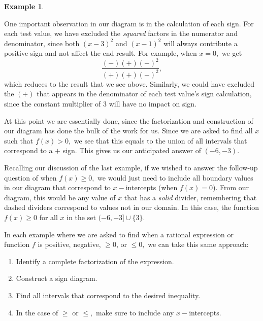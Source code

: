 \documentclass[12pt]{book}
\theoremstyle{definition}
\newtheorem{example}{Example}
\begin{document}
\begin{example}
\begin{center}
\end{center}
One important observation in our diagram is in the calculation of each sign.  For each test value, we have excluded the {\it squared} factors in the numerator and denominator, since both $(x-3)^2$ and $(x-1)^2$ will always contribute a positive sign and not affect the end result.  For example, when $x=0,$ we get $$\dfrac{(-)(+)(-)^2}{(+)(+)(-)^2},$$ which reduces to the result that we see above.  Similarly, we could have excluded the $(+)$ that appears in the denominator of each test value's sign calculation, since the constant multiplier of $3$ will have no impact on sign.
\par
At this point we are essentially done, since the factorization and construction of our diagram has done the bulk of the work for us.  Since we are asked to find all $x$ such that $f(x)>0,$ we see that this equals to the union of all intervals that correspond to a $+$ sign.  This gives us our anticipated answer of $(-6,-3)$.
\par
Recalling our discussion of the last example, if we wished to answer the follow-up question of when $f(x)\geq 0,$ we would just need to include all boundary values in our diagram that correspond to $x-$intercepts (when $f(x)=0$).  From our diagram, this would be any value of $x$ that has a {\it solid} divider, remembering that dashed dividers correspond to values not in our domain.  In this case, the function $f(x)\geq 0$ for all $x$ in the set $(-6,-3]\cup\{3\}$.
\end{example}
In each example where we are asked to find when a rational expression or function $f$ is positive, negative, $\geq 0$, or $\leq 0,$ we can take this same approach:
\begin{enumerate}
	\item Identify a complete factorization of the expression.
	\item Construct a sign diagram.
	\item Find all intervals that correspond to the desired inequality.
	\item In the case of $\geq$ or $\leq,$ make sure to include any $x-$intercepts.
\end{enumerate}
\end{document}

